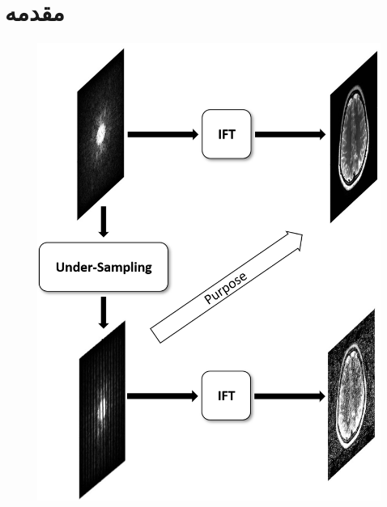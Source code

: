 \section{مقدمه}




\begin{figure}[t!]
	\centering
	\includegraphics[width=0.3\linewidth]{chapters/chapter-3/figs/purpose-diagram}
	\caption{}
	\label{fig:purpose-diagram}
\end{figure}


















